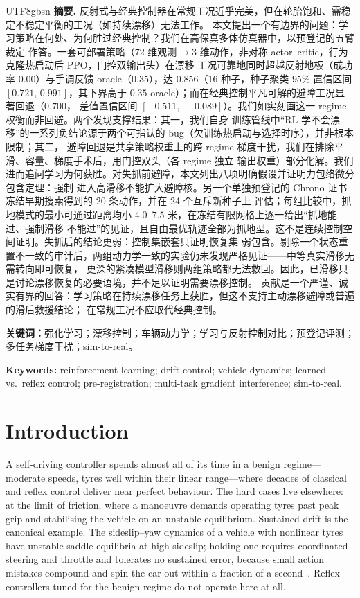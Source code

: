 \documentclass[11pt]{article}
\begin{document}
\begin{center}
\ifPDFTeX
\begin{CJK}{UTF8}{gbsn}
\fi
\noindent\textbf{摘要.}\;
反射式与经典控制器在常规工况近乎完美，但在轮胎饱和、需稳定不稳定平衡的工况（如持续漂移）无法工作。
本文提出一个有边界的问题：学习策略在何处、为何胜过经典控制？我们在高保真多体仿真器中，以预登记的五臂裁定
作答。一套可部署策略（72 维观测$\to$3 维动作，非对称 actor--critic，行为克隆热启动后 PPO，门控双输出头）在漂移
工况可靠地同时超越反射地板（成功率 $0.00$）与手调反馈 oracle（$0.35$），达 $0.856$（16 种子，种子聚类 $95\%$
置信区间 $[0.721,\,0.991]$，其下界高于 $0.35$ oracle）；而在经典控制平凡可解的避障工况显著回退（$0.700$，
差值置信区间 $[-0.511,\,-0.089]$）。我们如实刻画这一 regime 权衡而非回避。两个发现支撑结果：其一，我们自身
训练管线中“RL 学不会漂移”的一系列负结论源于两个可指认的 bug（欠训练热启动与选择时序），并非根本限制；其二，
避障回退是共享策略权重上的跨 regime 梯度干扰，我们在排除平滑、容量、梯度手术后，用门控双头（各 regime 独立
输出权重）部分化解。我们进而追问学习为何获胜。对失抓前避障，本文列出八项明确假设并证明力包络微分包含定理：强制
进入高滑移不能扩大避障核。另一个单独预登记的 Chrono 证书冻结早期搜索得到的 20 条动作，并在 24 个互斥新种子上
评估；每组比较中，抓地模式的最小可通过距离均小 $4.0$--$7.5$ 米，在冻结有限网格上逐一给出“抓地能过、强制滑移
不能过”的见证，且自由最优轨迹全部为抓地型。这不是连续控制空间证明。失抓后的结论更弱：控制集嵌套只证明恢复集
弱包含。剔除一个状态重置不一致的审计后，两组动力学一致的实验仍未发现严格见证——中等真实滑移无需转向即可恢复，
更深的紧凑模型滑移则两组策略都无法救回。因此，已滑移只是讨论漂移恢复的必要语境，并不足以证明需要漂移控制。
贡献是一个严谨、诚实有界的回答：学习策略在持续漂移任务上获胜，但这不支持主动漂移避障或普遍的滑后救援结论；
在常规工况不应取代经典控制。

\smallskip
\noindent\textbf{关键词：}强化学习；漂移控制；车辆动力学；学习与反射控制对比；预登记评测；多任务梯度干扰；sim-to-real。
\ifPDFTeX
\end{CJK}
\fi
\end{center}

\noindent\textbf{Keywords:} reinforcement learning; drift control; vehicle dynamics; learned vs.\
reflex control; pre-registration; multi-task gradient interference; sim-to-real.

\section{Introduction}
A self-driving controller spends almost all of its time in a benign regime---moderate speeds,
tyres well within their linear range---where decades of classical and reflex control deliver near
perfect behaviour. The hard cases live elsewhere: at the limit of friction, where a manoeuvre
demands operating tyres past peak grip and stabilising the vehicle on an unstable equilibrium.
Sustained drift is the canonical example. The sideslip--yaw dynamics of a vehicle with nonlinear
tyres have unstable saddle equilibria at high sideslip; holding one requires coordinated steering
and throttle and tolerates no sustained error, because small action mistakes compound and spin the
car out within a fraction of a second~\citep{velenis2010analysis}. Reflex controllers
tuned for the benign regime do not operate here at all.
\end{document}
